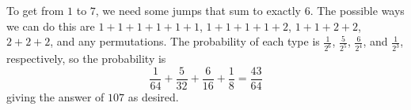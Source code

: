 To get from $1$ to $7$, we need some jumps that sum to exactly $6$. The possible ways we can do this are $1+1+1+1+1+1$, $1+1+1+1+2$, $1+1+2+2$, $2+2+2$, and any permutations. The probability of each type is $\frac{1}{2^6}$, $\frac{5}{2^5}$, $\frac{6}{2^4}$, and $\frac{1}{2^3}$, respectively, so the probability is \[\frac{1}{64}+\frac{5}{32}+\frac{6}{16}+\frac{1}{8}=\frac{43}{64}\] giving the answer of $\boxed{107}$ as desired.